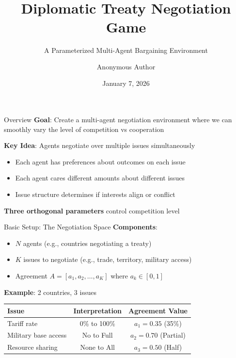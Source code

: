\documentclass{beamer}
\title{Diplomatic Treaty Negotiation Game}
\subtitle{A Parameterized Multi-Agent Bargaining Environment}
\author{Anonymous Author}
\date{January 7, 2026}
\begin{document}
\frame{\titlepage}

\begin{frame}{Overview}
\textbf{Goal}: Create a multi-agent negotiation environment where we can smoothly vary the level of competition vs cooperation

\vspace{0.5cm}

\textbf{Key Idea}: Agents negotiate over multiple issues simultaneously
\begin{itemize}
    \item Each agent has preferences about outcomes on each issue
    \item Each agent cares different amounts about different issues
    \item Issue structure determines if interests align or conflict
\end{itemize}

\vspace{0.5cm}

\textbf{Three orthogonal parameters} control competition level
\end{frame}

\begin{frame}{Basic Setup: The Negotiation Space}
\textbf{Components}:
\begin{itemize}
    \item $N$ agents (e.g., countries negotiating a treaty)
    \item $K$ issues to negotiate (e.g., trade, territory, military access)
    \item Agreement $A = [a_1, a_2, \ldots, a_K]$ where $a_k \in [0,1]$
\end{itemize}

\vspace{0.5cm}

\textbf{Example}: 2 countries, 3 issues
\begin{center}
\begin{tabular}{lcc}
\hline
Issue & Interpretation & Agreement Value \\
\hline
Tariff rate & 0\% to 100\% & $a_1 = 0.35$ (35\%) \\
Military base access & No to Full & $a_2 = 0.70$ (Partial) \\
Resource sharing & None to All & $a_3 = 0.50$ (Half) \\
\hline
\end{tabular}
\end{center}
\end{frame}
\end{document}
